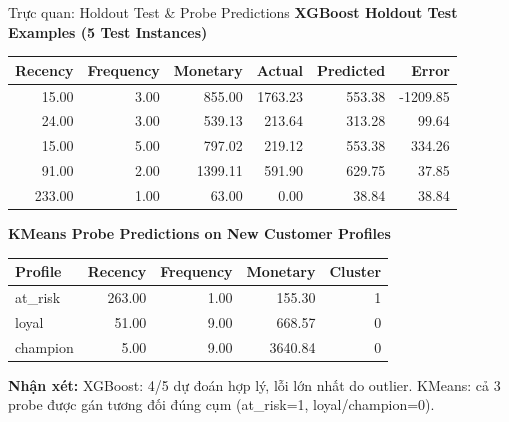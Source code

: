 \documentclass[10pt, aspectratio=169]{beamer}
\renewcommand{\arraystretch}{1.2}
\begin{document}
\begin{frame}[fragile]{Trực quan: Holdout Test \& Probe Predictions}
    \textbf{XGBoost Holdout Test Examples (5 Test Instances)}
    \vspace{-0.15cm}
    \begin{center}
        \tiny
        \setlength{\tabcolsep}{3pt}
        \renewcommand{\arraystretch}{1.15}
        \begin{tabular}{rrrrrr}
        \toprule
        \textbf{Recency} & \textbf{Frequency} & \textbf{Monetary} & \textbf{Actual} & \textbf{Predicted} & \textbf{Error} \\
        \midrule
        15.00 & 3.00 & 855.00 & 1763.23 & 553.38 & -1209.85 \\
        24.00 & 3.00 & 539.13 & 213.64 & 313.28 & 99.64 \\
        15.00 & 5.00 & 797.02 & 219.12 & 553.38 & 334.26 \\
        91.00 & 2.00 & 1399.11 & 591.90 & 629.75 & 37.85 \\
        233.00 & 1.00 & 63.00 & 0.00 & 38.84 & 38.84 \\
        \bottomrule
        \end{tabular}
    \end{center}
    
    \vspace{0.1cm}
    \textbf{KMeans Probe Predictions on New Customer Profiles}
    \vspace{-0.15cm}
    \begin{center}
        \tiny
        \setlength{\tabcolsep}{5pt}
        \renewcommand{\arraystretch}{1.15}
        \begin{tabular}{lrrrr}
        \toprule
        \textbf{Profile} & \textbf{Recency} & \textbf{Frequency} & \textbf{Monetary} & \textbf{Cluster} \\
        \midrule
        at\_risk & 263.00 & 1.00 & 155.30 & 1 \\
        loyal & 51.00 & 9.00 & 668.57 & 0 \\
        champion & 5.00 & 9.00 & 3640.84 & 0 \\
        \bottomrule
        \end{tabular}
    \end{center}
    
    \vspace{0.15cm}
    \small
    \textbf{Nhận xét:} XGBoost: 4/5 dự đoán hợp lý, lỗi lớn nhất do outlier. KMeans: cả 3 probe được gán tương đối đúng cụm (at\_risk=1, loyal/champion=0).
\end{frame}
\end{document}
